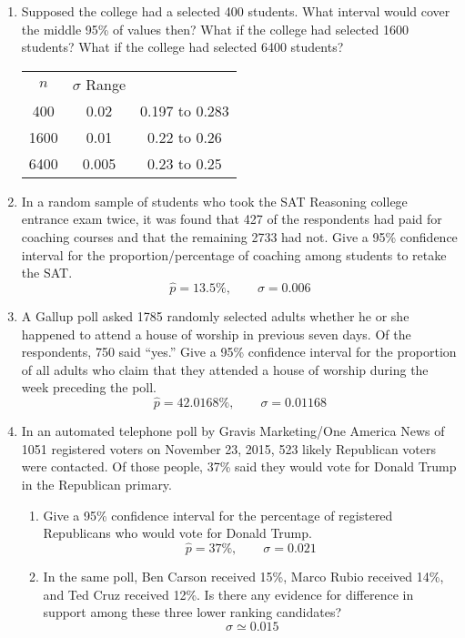 \begin{enumerate}
\item Supposed the college had a selected 400 students. What interval would cover the middle 95\% of values then?  What if the college had selected 1600 students? What if the college had selected 6400 students? 	\ifsolns
	\par
	\begin{tabular}{ccc}
	$n$ & $\sigma$ Range\\
	400 & 0.02 & 0.197 to 0.283\\
	1600 & 0.01 & 0.22 to 0.26\\
	6400 & 0.005 & 0.23 to 0.25\\
	\end{tabular}
	\fi
\vfill

\clearpage
\item In a random sample of students who took the SAT Reasoning college entrance exam twice, it was found that 427 of the respondents had paid for coaching courses and that the remaining 2733 had not. Give a 95\% confidence interval for the proportion/percentage of coaching among students to retake the SAT. 
	\ifsolns
	\[ \hat{p}=13.5\%,\qquad \sigma = 0.006\]
	\fi
\vfill


\item A Gallup poll asked 1785 randomly selected adults whether he or she happened to attend a house of worship in previous seven days. Of the respondents, 750 said  ``yes.'' Give a 95\% confidence interval for the proportion of all adults who claim that they attended a house of worship during the week preceding the poll. 	\ifsolns
	\[ \hat{p}=42.0168\%,\qquad \sigma = 0.01168\]
	\fi
\vfill
 
\clearpage


\item In an automated telephone poll by Gravis Marketing/One America News of 1051 registered voters on November 23, 2015, 523 likely Republican voters were contacted.  Of those people, 37\% said they would vote for Donald Trump in the Republican primary.
\begin{enumerate}
	\item Give a 95\% confidence interval for the percentage of registered Republicans who would vote for Donald Trump. 	\ifsolns
	\[ \hat{p}=37\%,\qquad \sigma = 0.021\]
	\fi
\vfill
	\item In the same poll, Ben Carson received 15\%, Marco Rubio received 14\%, and Ted Cruz received 12\%. Is there any evidence for difference in support among these three lower ranking candidates? 
		\ifsolns
	\[ \ \sigma \simeq 0.015\]
	\fi
\vfill
\end{enumerate}


\end{enumerate}
